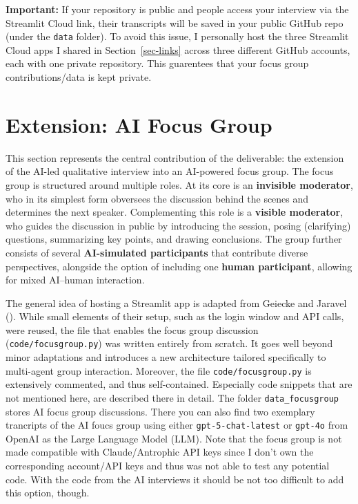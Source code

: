 \documentclass[
  letterpaper,
  DIV=11,
  numbers=noendperiod]{scrartcl}
\begin{document}
\textbf{Important:} If your repository is public and people access your
interview via the Streamlit Cloud link, their transcripts will be saved
in your public GitHub repo (under the \texttt{data} folder). To avoid
this issue, I personally host the three Streamlit Cloud apps I shared in
Section~\ref{sec-links} across three different GitHub accounts, each
with one private repository. This guarentees that your focus group
contributions/data is kept private.

\section{Extension: AI Focus Group}\label{sec-focusgroup}

This section represents the central contribution of the deliverable: the
extension of the AI-led qualitative interview into an AI-powered focus
group. The focus group is structured around multiple roles. At its core
is an \textbf{invisible moderator}, who in its simplest form obversees
the discussion behind the scenes and determines the next speaker.
Complementing this role is a \textbf{visible moderator}, who guides the
discussion in public by introducing the session, posing (clarifying)
questions, summarizing key points, and drawing conclusions. The group
further consists of several \textbf{AI-simulated participants} that
contribute diverse perspectives, alongside the option of including one
\textbf{human participant}, allowing for mixed AI--human interaction.

The general idea of hosting a Streamlit app is adapted from Geiecke and
Jaravel (). While small
elements of their setup, such as the login window and API calls, were
reused, the file that enables the focus group discussion
(\texttt{code/focusgroup.py}) was written entirely from scratch. It goes
well beyond minor adaptations and introduces a new architecture tailored
specifically to multi-agent group interaction. Moreover, the file
\texttt{code/focusgroup.py} is extensively commented, and thus
self-contained. Especially code snippets that are not mentioned here,
are described there in detail. The folder \texttt{data\_focusgroup}
stores AI focus group discussions. There you can also find two exemplary
trancripts of the AI foucs group using either \texttt{gpt-5-chat-latest}
or \texttt{gpt-4o} from OpenAI as the Large Language Model (LLM). Note
that the focus group is not made compatible with Claude/Antrophic API
keys since I don't own the corresponding account/API keys and thus was
not able to test any potential code. With the code from the AI
interviews it should be not too difficult to add this option, though.
\end{document}
